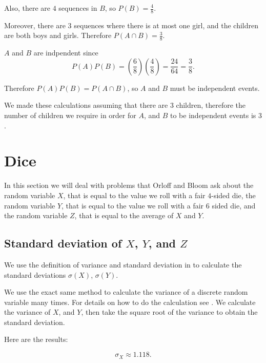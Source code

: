 \documentclass[a4paper,11pt]{article}
\begin{document}
Also, there are $4$ sequences in $B$, so $P\left( B \right) = \frac{4}{8}$.

Moreover, there are $3$ sequences where there is at most one girl, and
the children are both boys and girls.  Therefore $P\left( A \cap B \right) = \frac{3}{8}$.

$A$ and $B$ are indpendent since
\begin{equation}
P\left(A \right) P \left( B \right)
  = \left( \frac{6}{8} \right) \left( \frac{4}{8} \right)
  = \frac{24}{64} = \frac{3}{8}.
\end{equation}

Therefore $P\left(A \right) P\left(B \right) = P \left(A \cap B \right)$,
so $A$ and $B$ must be independent events.

We made these calculations assuming that there are $3$ children,
therefore the number of children we require in order for $A$, and
$B$ to be independent events is $3$.

\section{Dice}

In this section we will deal with problems that Orloff and
Bloom ask about the random variable $X$, that is equal to the value
we roll with a fair $4$-sided die, the random variable
$Y$, that is equal to the value we roll with a fair $6$ sided die,
and the random variable $Z$, that is equal to the average
of $X$ and $Y$.

\subsection{Standard deviation of $X$, $Y$, and $Z$}


We use the definition of variance and standard deviation in \cite{reading5a} to
calculate the standard deviations $\sigma \left( X \right)$, $\sigma \left( Y \right)$.

We use the exact same method to calculate the variance of a discrete random
variable many times. For details on how to do the calculation see
\cite{reading5aAns}.  We calculate the variance of $X$, and $Y$, then take
the square root of the variance to obtain the standard deviation.

Here are the results:

\begin{equation}
  \sigma_{X} \approx 1.118.
\end{equation}
\end{document}
